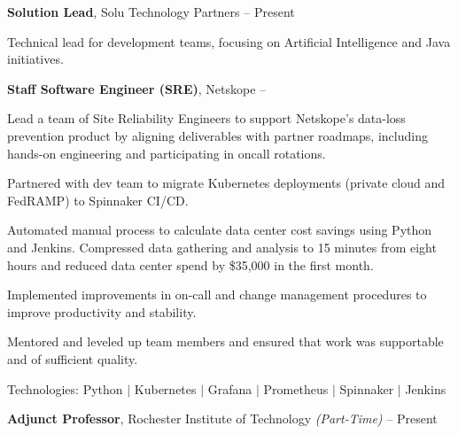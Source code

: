 \documentclass[MMMMyyyy,nonstopmode]{simpleresumecv_stacked}
\newcommand{\tech}[1]{\Gap\textrm{Technologies:} #1}
\begin{document}
\begin{Body}
\Entry
\textbf{Solution Lead}, Solu Technology Partners
\hfill
{} -- Present

\Gap
\begin{Detail}
Technical lead for development teams, focusing on Artificial Intelligence and Java initiatives.
\end{Detail}


\BigGap

\Entry
\textbf{Staff Software Engineer (SRE)}, Netskope
\hfill
 -- 

\Gap
\begin{Detail}

Lead a team of Site Reliability Engineers to support Netskope's data-loss prevention product by aligning deliverables with partner roadmaps, including hands-on engineering and participating in oncall rotations.

\Gap

\BulletItem
Partnered with dev team to migrate Kubernetes deployments (private cloud and FedRAMP) to Spinnaker CI/CD.


\BulletItem
Automated manual process to calculate data center cost savings using Python and Jenkins. 
Compressed data gathering and analysis to 15 minutes from eight hours and reduced data center spend by \$35,000 in the first month.


\BulletItem
Implemented improvements in on-call and change management procedures to improve productivity and stability.

\BulletItem
Mentored and leveled up team members and ensured that work was supportable and of sufficient quality.


\end{Detail}

\tech{Python $|$ Kubernetes $|$ Grafana $|$ Prometheus $|$ Spinnaker $|$ Jenkins}

\BigGap

\iffalse %
\Entry
\textbf{Adjunct Professor}, Rochester Institute of Technology \textit{(Part-Time)}
\hfill
 --
Present


\end{Body}
\end{document}
